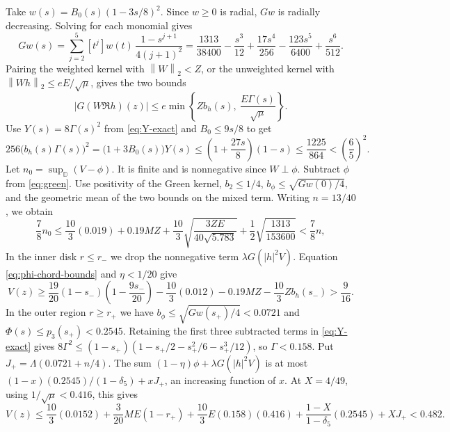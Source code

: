 \documentclass[11pt,a4paper,reqno]{amsart}
\theoremstyle{remark}
\numberwithin{equation}{section}
\newcommand{\norm}[1]{\left\|#1\right\|_2}
\newcommand{\D}{\mathbb D}
\begin{document}
Take $w(s)=B_0(s)(1-3s/8)^2$. Since $w\ge0$ is radial, $Gw$ is radially
decreasing. Solving for each monomial gives
\[
  Gw(s)=\sum_{j=2}^5[t^j]w(t)\,\frac{1-s^{j+1}}{4(j+1)^2}
       =\frac{1313}{38400}-\frac{s^3}{12}+\frac{17s^4}{256}-\frac{123s^5}{6400}+\frac{s^6}{512}.
\]
Pairing the weighted kernel with $\norm{W}<Z$, or the unweighted kernel
with $\norm{Wh}\le eE/\sqrt\mu$, gives the two bounds
\[
  |G(W\Re h)(z)|\le e\min\left\{Zb_h(s),\ \frac{E\Gamma(s)}{\sqrt\mu}\right\}.
\]
Use $Y(s)=8\Gamma(s)^2$ from \eqref{eq:Y-exact} and $B_0\le9s/8$ to get
\[
  256\bigl(b_h(s)\Gamma(s)\bigr)^2=\bigl(1+3B_0(s)\bigr)Y(s)
    \le\left(1+\frac{27s}{8}\right)(1-s)\le\frac{1225}{864}<\left(\frac65\right)^2.
\]
Let $n_0=\sup_\D(V-\phi)$. It is finite and is nonnegative since $W\perp\phi$.
Subtract $\phi$ from \eqref{eq:green}. Use positivity of the Green kernel,
$b_2\le1/4$, $b_\phi\le\sqrt{Gw(0)/4}$, and the geometric mean of the two
bounds on the mixed term. Writing $n=13/40$, we obtain
\[
  \frac78 n_0\le\frac{10}{3}(0.019)+0.19MZ
    +\frac{10}{3}\sqrt{\frac{3ZE}{40\sqrt{5.783}}}
    +\frac12\sqrt{\frac{1313}{153600}}<\frac78 n,
\]
In the inner disk $r\le r_-$ we drop the nonnegative term
$\lambda G(|h|^2 V)$. Equation \eqref{eq:phi-chord-bounds} and
$\eta<1/20$ give
\[
  V(z)\ge\frac{19}{20}(1-s_-)\left(1-\frac{9s_-}{20}\right)
    -\frac{10}{3}(0.012)-0.19MZ-\frac{10}{3}Zb_h(s_-)>\frac{9}{16}.
\]
In the outer region $r\ge r_+$ we have $b_\phi\le\sqrt{Gw(s_+)/4}<0.0721$
and $\Phi(s)\le p_3(s_+)<0.2545$. Retaining the first three subtracted terms
in \eqref{eq:Y-exact} gives
$8\Gamma^2\le(1-s_+)(1-s_+/2-s_+^2/6-s_+^3/12)$, so $\Gamma<0.158$.
Put $J_+=\Lambda(0.0721+n/4)$. The sum $(1-\eta)\phi+\lambda G(|h|^2V)$
is at most $(1-x)(0.2545)/(1-\delta_5)+xJ_+$, an increasing function of $x$.
At $X=4/49$, using $1/\sqrt\mu<0.416$, this gives
\[
  V(z)\le\frac{10}{3}(0.0152)+\frac{3}{20}ME(1-r_+)
    +\frac{10}{3}E(0.158)(0.416)
    +\frac{1-X}{1-\delta_5}(0.2545)+XJ_+<0.482.
\]
\end{document}
